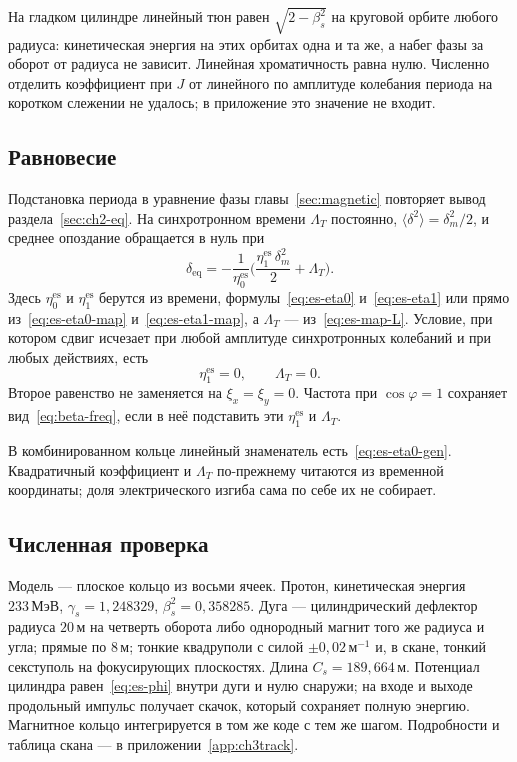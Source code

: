 На гладком цилиндре линейный тюн равен $\sqrt{2-\beta_s^2}$ на круговой орбите любого радиуса: кинетическая энергия на этих орбитах одна и та же, а набег фазы за оборот от радиуса не зависит. Линейная хроматичность равна нулю. Численно отделить коэффициент при $J$ от линейного по амплитуде колебания периода на коротком слежении не удалось; в приложение это значение не входит.

\subsection{Равновесие}
\label{sec:es-eq}

Подстановка периода в уравнение фазы главы~\ref{sec:magnetic} повторяет вывод раздела~\ref{sec:ch2-eq}. На синхротронном времени $\Lambda_T$ постоянно, $\langle\delta^2\rangle=\delta_m^2/2$, и среднее опоздание обращается в нуль при
\begin{equation}
\label{eq:es-deq}
\delta_{\mathrm{eq}}
=-\frac{1}{\eta_0^{\mathrm{es}}}
\Biggl(
\frac{\eta_1^{\mathrm{es}}\,\delta_m^2}{2}
+\Lambda_T
\Biggr).
\end{equation}
Здесь $\eta_0^{\mathrm{es}}$ и $\eta_1^{\mathrm{es}}$ берутся из времени, формулы~\eqref{eq:es-eta0} и~\eqref{eq:es-eta1} или прямо из~\eqref{eq:es-eta0-map} и~\eqref{eq:es-eta1-map}, а $\Lambda_T$ --- из~\eqref{eq:es-map-L}. Условие, при котором сдвиг исчезает при любой амплитуде синхротронных колебаний и при любых действиях, есть
\begin{equation}
\label{eq:es-comp}
\eta_1^{\mathrm{es}}=0,
\qquad
\Lambda_T=0.
\end{equation}
Второе равенство не заменяется на $\xi_x=\xi_y=0$. Частота при $\cos\varphi=1$ сохраняет вид~\eqref{eq:beta-freq}, если в неё подставить эти $\eta_1^{\mathrm{es}}$ и $\Lambda_T$.

В комбинированном кольце линейный знаменатель есть~\eqref{eq:es-eta0-gen}. Квадратичный коэффициент и $\Lambda_T$ по-прежнему читаются из временной координаты; доля электрического изгиба сама по себе их не собирает.

\subsection{Численная проверка}
\label{sec:es-num}

Модель --- плоское кольцо из восьми ячеек. Протон, кинетическая энергия $233\,\mathrm{МэВ}$, $\gamma_s=1{,}248329$, $\beta_s^2=0{,}358285$. Дуга --- цилиндрический дефлектор радиуса $20\,\mathrm{м}$ на четверть оборота либо однородный магнит того же радиуса и угла; прямые по $8\,\mathrm{м}$; тонкие квадруполи с силой $\pm 0{,}02\,\mathrm{м}^{-1}$ и, в скане, тонкий секступоль на фокусирующих плоскостях. Длина $C_s=189{,}664\,\mathrm{м}$. Потенциал цилиндра равен~\eqref{eq:es-phi} внутри дуги и нулю снаружи; на входе и выходе продольный импульс получает скачок, который сохраняет полную энергию. Магнитное кольцо интегрируется в том же коде с тем же шагом. Подробности и таблица скана --- в приложении~\ref{app:ch3track}.

